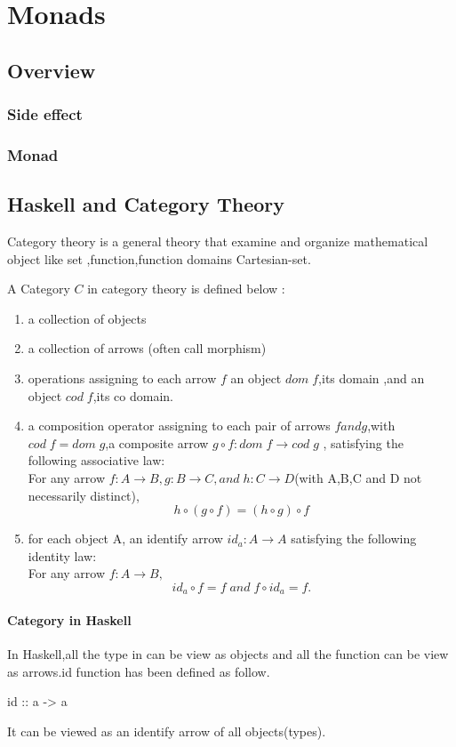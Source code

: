 \chapter{Monads}
\section{Overview}
\subsection{Side effect}


\subsection{Monad}








\section{Haskell and Category Theory}
Category theory is a general theory that examine and organize mathematical object like set ,function,function domains Cartesian-set.

A Category $C $ in category theory is defined below :
\begin{enumerate}
\item a collection of objects 
\item a collection of arrows (often call morphism) 
\item operations assigning to each arrow $f$ an object $dom\;f$,its domain ,and an object $cod\;f$,its co domain.
\item a composition operator assigning to each pair of arrows $f and g$,with $cod\;f = dom\;g$,a composite arrow $ g \circ f:dom\;f \rightarrow  cod\;g$ , satisfying the following associative law: \\
For any arrow $f: A \rightarrow B,g:B \rightarrow C,and\;h: C\rightarrow D$(with A,B,C and D not necessarily distinct),
$$h\circ (g\circ f) = (h\circ g)\circ f$$
\item for each object A, an identify arrow $id_{a}: A \rightarrow A$ satisfying the following identity law:\\
For any arrow $ f: A \rightarrow B,$ 
$$ id_{a} \circ f = f  \;and\;  f\circ id_{a} = f. $$
\end{enumerate}\cite{pierce_basic_1991}


\subsubsection*{Category in Haskell}
In Haskell,all the type in can be view as objects and all the function can be view as arrows.id function has been defined as follow.
\begin{hcode}
 id :: a -> a
\end{hcode}
It can be viewed as an identify arrow of all objects(types).
